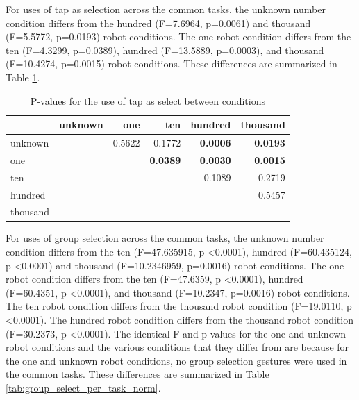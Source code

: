For uses of tap as selection across the common tasks, the unknown number condition differs from the hundred (F=7.6964, p=0.0061) and thousand (F=5.5772, p=0.0193) robot conditions. 
The one robot condition differs from the ten (F=4.3299, p=0.0389), hundred (F=13.5889, p=0.0003), and thousand (F=10.4274, p=0.0015) robot conditions.
These differences are summarized in Table \ref{tab:tap_select_per_task_norm}.

\begin{table}
	\begin{tabular}{l|r r r r r}
		& unknown & one    & ten        & hundred     & thousand   \\ 
		\hline
		unknown & & 0.5622 & 0.1772 & \textbf{0.0006} & \textbf{0.0193} \\   
		one & & & \textbf{0.0389} & \textbf{0.0030} & \textbf{0.0015} \\
		ten & & & & 0.1089 & 0.2719   \\
		hundred & & & & & 0.5457   \\
		thousand & & & & &\\
	\end{tabular}
	\caption{P-values for the use of tap as select between conditions}
	\label{tab:tap_select_per_task_norm}
\end{table}

For uses of group selection across the common tasks, the unknown number condition differs from the ten (F=47.635915, p \textless 0.0001), hundred (F=60.435124, p \textless 0.0001) and thousand (F=10.2346959, p=0.0016) robot conditions. 
The one robot condition differs from the ten (F=47.6359, p \textless 0.0001), hundred (F=60.4351, p \textless 0.0001), and thousand (F=10.2347, p=0.0016) robot conditions.
The ten robot condition differs from the thousand robot condition (F=19.0110, p \textless 0.0001).
The hundred robot condition differs from the thousand robot condition (F=30.2373, p \textless 0.0001).
The identical F and p values for the one and unknown robot conditions and the various conditions that they differ from are because for the one and unknown robot conditions, no group selection gestures were used in the common tasks. 
These differences are summarized in Table \ref{tab:group_select_per_task_norm}.

